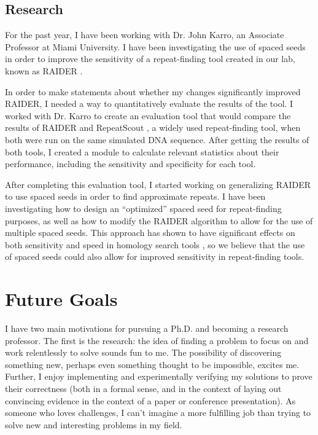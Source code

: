 \documentclass[12pt]{article}
\begin{document}
\subsection{Research}
For the past year, I have been working with Dr. John Karro, an Associate Professor at Miami University. 
I have been investigating the use of spaced seeds in order to improve the sensitivity of a repeat-finding tool created in our lab, known as RAIDER \cite{figueroa2013raiderpaper}. 

In order to make statements about whether my changes significantly improved RAIDER, I needed a way to quantitatively evaluate the results of the tool. 
I worked with Dr. Karro to create an evaluation tool that would compare the results of RAIDER and RepeatScout \cite{price2005novo}, a widely used repeat-finding tool, when both were run on the same simulated DNA sequence. 
After getting the results of both tools, I created a module to calculate relevant statistics about their performance, including the sensitivity and specificity for each tool.

After completing this evaluation tool, I started working on generalizing RAIDER to use spaced seeds in order to find approximate repeats.
I have been investigating how to design an ``optimized'' spaced seed for repeat-finding purposes, as well as how to modify the RAIDER algorithm to allow for the use of multiple spaced seeds.
This approach has shown to have significant effects on both sensitivity and speed in homology search tools \cite{ma2002patternhunter}, so we believe that the use of spaced seeds could also allow for improved sensitivity in repeat-finding tools.

\section*{Future Goals}
I have two main motivations for pursuing a Ph.D. and becoming a research professor.
The first is the research: the idea of finding a problem to focus on and work relentlessly to solve sounds fun to me.
The possibility of discovering something new, perhaps even something thought to be impossible, excites me.
Further, I enjoy implementing and experimentally verifying my solutions to prove their correctness (both in a formal sense, and in the context of laying out convincing evidence in the context of a paper or conference presentation).
As someone who loves challenges, I can't imagine a more fulfilling job than trying to solve new and interesting problems in my field.
\end{document}
